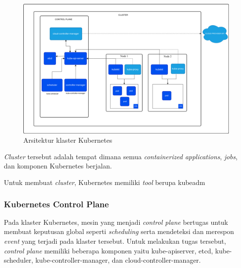 \begin{figure}[H]
  \centering

  \includegraphics[scale=0.2]{gambar/kubernetes-cluster-architecture.png}

  \caption{Arsitektur klaster Kubernetes}
  \label{fig:arsitektur-cluster-kubernetes}
\end{figure}

\emph{Cluster} tersebut adalah tempat dimana semua \emph{containerized applications},
\emph{jobs}, dan komponen Kubernetes berjalan. 

Untuk membuat \emph{cluster}, Kubernetes memiliki \emph{tool} berupa kubeadm

\subsubsection{Kubernetes Control Plane}

Pada klaster Kubernetes, mesin yang menjadi \emph{control plane} bertugas
untuk membuat keputusan global seperti \emph{scheduling} serta mendeteksi
dan merespon \emph{event} yang terjadi pada klaster tersebut. Untuk melakukan
tugas tersebut, \emph{control plane} memiliki beberapa komponen yaitu kube-apiserver,
etcd, kube-scheduler, kube-controller-manager, dan cloud-controller-manager.

